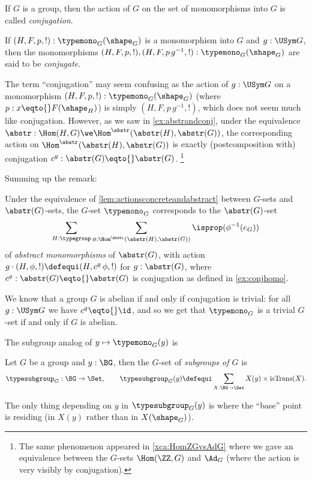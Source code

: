 \begin{definition}
  \label{def:conjactonmonos}
  If $G$ is a group, then the action of $G$ on the set of monomorphisms into $G$ is called \emph{conjugation}.

  \label{def:conjugate}
  If $(H,F,p,!):\typemono_G(\shape_G)$ is a monomorphism into $G$ and $g:\USym G$, then the monomorphisms  $(H,F,p,!),(H,F,p\,g^{-1},!):\typemono_G(\shape_G)$ are said to be \emph{conjugate}.
\end{definition}
\begin{remark}
  \label{rem:whyconjugate}
  The term ``conjugation'' may seem confusing as the %
action of $g:\USym G$ on a monomorphism $(H,F,p,!):\typemono_G(\shape_G)$ (where $p:x\eqto{}F(\shape_H)$) is simply $(H,F,p\,g^{-1},!)$, which does not seem much like conjugation.
However, as we saw in \cref{ex:abstrandconj}, under the equivalence $\abstr:\Hom(H,G)\we\Hom^\abstr(\abstr(H),\abstr(G))$, the corresponding action on $\Hom^\abstr(\abstr(H),\abstr(G))$ is exactly (postcomposition with) conjugation $c^g:\abstr(G)\eqto{}\abstr(G)$.
\footnote{The same phenomenon appeared in \cref{xca:HomZGvsAdG} where we gave an equivalence between the $G$-sets $\Hom(\ZZ,G)$ and $\Ad_G$ (where the action is very visibly by conjugation).}
  \label{rem:conjactiononmonos}
\end{remark}
Summing up the remark:
\begin{lemma}
  \label{lem:conjugationabstractly}
  Under the equivalence of \cref{lem:actionsconcreteandabstract} between $G$-sets and $\abstr(G)$-sets, the $G$-set $\typemono_G$ corresponds to the $\abstr(G)$-set
$$\sum_{H:\typegroup}\sum_{\phi:\Hom^\abstr(\abstr(H),\abstr(G))}\isprop(\phi^{-1}(e_G))$$ of \emph{abstract monomorphisms} of $\abstr(G)$, with action $g\cdot(H,\phi,!)\defequi(H,c^g\,\phi,!)$ for $g:\abstr(G)$, where  $c^g:\abstr(G)\eqto{}\abstr(G)$ is conjugation as defined in \cref{ex:conjhomo}.
\end{lemma}
\begin{remark}
  \label{rem:typeofsubgpstrivifab}
  We know that a group $G$ is abelian if and only if conjugation is trivial: for all $g:\USym G$ we have $c^g\eqto{}\id$, and so we get that $\typemono_G$ is a trivial $G$-set if and only if $G$ is abelian.
\end{remark}

The subgroup analog of $y\mapsto\typemono_G(y)$ is

\begin{definition}
  Let $G$ be a group and $y:\BG$, then the $G$-set of \emph{subgroups of $G$} is
  $$\typesubgroup_G:\BG\to\Set,\qquad\typesubgroup_G(y)\defequi\sum_{X:\BG\to\Set}
  X(y)\times\mathrm{isTrans}(X).$$
\end{definition}
The only thing depending on $y$ in $\typesubgroup_G(y)$ is where the ``base'' point is residing
(in $X(y)$ rather than in $X(\shape_G)$).

